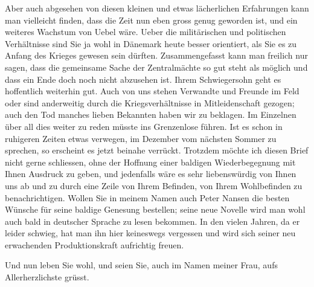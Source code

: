 \pstart
           Aber auch abgesehen von diesen kleinen und etwas lächerlichen Erfahrungen kann man
               vielleicht finden, dass die Zeit nun eben gross genug geworden ist, und ein weiteres
               Wachstum von Uebel wäre. Ueber die militärischen und politischen Verhältnisse sind
               Sie ja wohl in Dänemark heute besser
               orientiert, als Sie es zu Anfang des Krieges gewesen \introOben{}sein\introOben{}
               dürften. Zusammengefasst kann man freilich nur sagen, dass die gemeinsame Sache der
               Zentralmächte so gut steht als möglich und dass ein Ende doch noch nicht abzusehen
               ist. Ihrem Schwiegersohn geht
               es hoffentlich weiterhin gut. Auch von uns stehen Verwandte und Freunde im Feld oder
               sind anderweitig durch die Kriegsverhältnisse in Mitleidenschaft gezogen; auch den
               Tod manches lieben {\pb}Bekannten haben wir zu
               beklagen. Im Einzelnen über all dies weiter zu reden müsste ins Grenzenlose führen.
               Ist es schon in ruhigeren Zeiten etwas verwegen, im Dezember vom nächsten Sommer zu
               sprechen, so erscheint es jetzt beinahe verrückt. Trotzdem möchte ich diesen Brief
               nicht gerne schliessen, ohne der Hoffnung einer baldigen Wiederbegegnung mit Ihnen
               Ausdruck zu geben, und jedenfalls wäre es sehr liebenswürdig von Ihnen uns ab und zu
               durch eine Zeile von Ihrem Befinden, von Ihrem Wohlbefinden zu benachrichtigen.
               Wollen Sie in meinem Namen auch Peter Nansen
               die besten Wünsche für seine baldige Genesung bestellen; seine neue Novelle wird man wohl auch bald in
               deutscher Sprache zu lesen bekommen. In den vielen Jahren, da er leider schwieg, hat
               man ihn hier keineswegs vergessen\strikeout{,} und wird sich
               seiner neu erwachenden Produktionskraft aufrichtig freuen.\pend
           
\pstart
           Und nun leben Sie wohl, und seien Sie, auch im Namen meiner Frau, aufs Allerherzlichste grüsst.\pend
           
